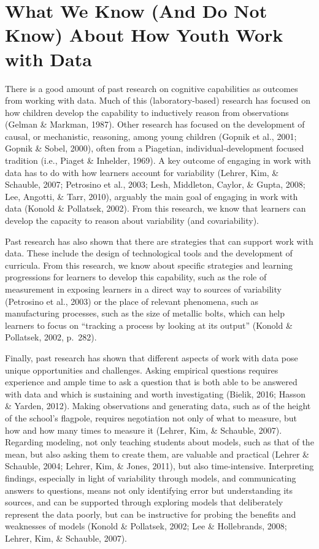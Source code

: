 \documentclass[]{book}
\theoremstyle{definition}
\theoremstyle{definition}
\theoremstyle{definition}
\theoremstyle{remark}
\begin{document}
\section{What We Know (And Do Not Know) About How Youth Work with
Data}\label{what-we-know-and-do-not-know-about-how-youth-work-with-data}

There is a good amount of past research on cognitive capabilities as
outcomes from working with data. Much of this (laboratory-based)
research has focused on how children develop the capability to
inductively reason from observations (Gelman \& Markman, 1987). Other
research has focused on the development of causal, or mechanistic,
reasoning, among young children (Gopnik et al., 2001; Gopnik \& Sobel,
2000), often from a Piagetian, individual-development focused tradition
(i.e., Piaget \& Inhelder, 1969). A key outcome of engaging in work with
data has to do with how learners account for variability (Lehrer, Kim,
\& Schauble, 2007; Petrosino et al., 2003; Lesh, Middleton, Caylor, \&
Gupta, 2008; Lee, Angotti, \& Tarr, 2010), arguably the main goal of
engaging in work with data (Konold \& Pollatsek, 2002). From this
research, we know that learners can develop the capacity to reason about
variability (and covariability).

Past research has also shown that there are strategies that can support
work with data. These include the design of technological tools and the
development of curricula. From this research, we know about specific
strategies and learning progressions for learners to develop this
capability, such as the role of measurement in exposing learners in a
direct way to sources of variability (Petrosino et al., 2003) or the
place of relevant phenomena, such as manufacturing processes, such as
the size of metallic bolts, which can help learners to focus on
``tracking a process by looking at its output'' (Konold \& Pollatsek,
2002, p.~282).

Finally, past research has shown that different aspects of work with
data pose unique opportunities and challenges. Asking empirical
questions requires experience and ample time to ask a question that is
both able to be answered with data and which is sustaining and worth
investigating (Bielik, 2016; Hasson \& Yarden, 2012). Making
observations and generating data, such as of the height of the school's
flagpole, requires negotiation not only of what to measure, but how and
how many times to measure it (Lehrer, Kim, \& Schauble, 2007). Regarding
modeling, not only teaching students about models, such as that of the
mean, but also asking them to create them, are valuable and practical
(Lehrer \& Schauble, 2004; Lehrer, Kim, \& Jones, 2011), but also
time-intensive. Interpreting findings, especially in light of
variability through models, and communicating answers to questions,
means not only identifying error but understanding its sources, and can
be supported through exploring models that deliberately represent the
data poorly, but can be instructive for probing the benefits and
weaknesses of models (Konold \& Pollatsek, 2002; Lee \& Hollebrands,
2008; Lehrer, Kim, \& Schauble, 2007).
\end{document}
